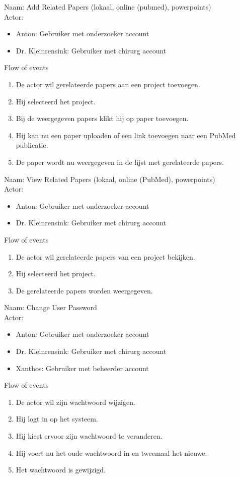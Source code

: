 \item   Naam: Add Related Papers (lokaal, online (pubmed), powerpoints) \\
	Actor:
	\begin{itemize}
		\item Anton: Gebruiker met onderzoeker account
		\item Dr. Kleinrensink: Gebruiker met chirurg account
	\end{itemize}
	Flow of events
	\begin{enumerate}
		\item De actor wil gerelateerde papers aan een project toevoegen.
		\item Hij selecteerd het project.
		\item Bij de weergegeven papers klikt hij op paper toevoegen.
		\item Hij kan nu een paper uploaden of een link toevoegen naar een PubMed publicatie.
		\item De paper wordt nu weergegeven in de lijst met gerelateerde papers.
	\end{enumerate}


\item   Naam: View Related Papers (lokaal, online (PubMed), powerpoints)  \\
	Actor:
	\begin{itemize}
		\item Anton: Gebruiker met onderzoeker account
		\item Dr. Kleinrensink: Gebruiker met chirurg account
	\end{itemize}
	Flow of events
	\begin{enumerate}
		\item De actor wil gerelateerde papers van een project bekijken.
		\item Hij selecteerd het project.
		\item De gerelateerde papers worden weergegeven. 
	\end{enumerate}


\item   Naam: Change User Password \\
	Actor:
	\begin{itemize}
		\item Anton: Gebruiker met onderzoeker account
		\item Dr. Kleinrensink: Gebruiker met chirurg account
		\item Xanthos: Gebruiker met beheerder account
	\end{itemize}
	Flow of events
	\begin{enumerate}
		\item De actor wil zijn wachtwoord wijzigen.
		\item Hij logt in op het systeem.
		\item Hij kiest ervoor zijn wachtwoord te veranderen.
		\item Hij voert nu het oude wachtwoord in en tweemaal het nieuwe.
		\item Het wachtwoord is gewijzigd.
	\end{enumerate}

